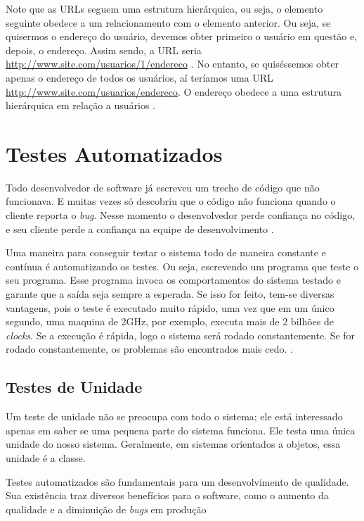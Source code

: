 Note que as URLs seguem uma estrutura hierárquica, ou seja, o elemento seguinte obedece a um relacionamento com o elemento anterior. Ou seja, se quisermos o endereço do usuário, devemos obter primeiro o usuário em questão e, depois, o endereço. Assim sendo, a URL seria \url{http://www.site.com/usuarios/1/endereco} . No entanto, se quiséssemos obter apenas o endereço de todos os usuários, aí teríamos uma URL \url{http://www.site.com/usuarios/endereco}. O endereço obedece a uma estrutura hierárquica em relação a usuários \cite{Saudate:2012}.


\section{Testes Automatizados} \label{sec:TestesAutomatizados}

Todo desenvolvedor de software já escreveu um trecho de código que não funcionava. E muitas vezes só descobriu que o código não funciona quando o cliente reporta o \textit{bug}. Nesse momento o desenvolvedor perde confiança no código, e seu cliente perde a confiança na equipe de desenvolvimento \cite{Aniche:2015}.

Uma maneira para conseguir testar o sistema todo de maneira constante e contínua é automatizando os testes. Ou seja, escrevendo um programa que teste o seu programa. Esse programa invoca os comportamentos do sistema testado e garante que a saída seja sempre a esperada. Se isso for feito, tem-se diversas vantagens, pois o teste é executado muito rápido, uma vez que em um único segundo, uma maquina de 2GHz, por exemplo, executa mais de 2 bilhões de \textit{clocks}. Se a execução é rápida, logo o sistema será rodado constantemente. Se for rodado constantemente, os problemas são encontrados mais cedo. \cite{Aniche:2012}.

\subsection{Testes de Unidade}\label{Testes Automatizados}

Um teste de unidade não se preocupa com todo o sistema; ele está interessado apenas em saber se uma pequena parte do sistema funciona. Ele testa uma única unidade do nosso sistema. Geralmente, em sistemas orientados a objetos, essa unidade é a classe.

Testes automatizados são fundamentais para um desenvolvimento de qualidade. Sua existência traz diversos benefícios para o software, como o aumento da qualidade e a diminuição de \textit{bugs} em produção \cite{Aniche:2012}
